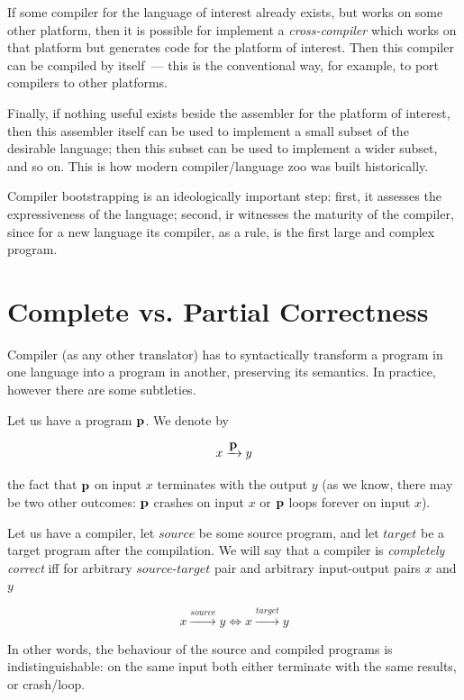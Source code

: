 If some compiler for the language of interest already exists, but works on some other platform, then it is possible for
implement a \emph{cross-compiler} which works on that platform but generates code for the platform of interest. Then
this compiler can be compiled by itself~--- this is the conventional way, for example, to port  compilers
to other platforms.

Finally, if nothing useful exists beside the assembler for the platform of interest, then this assembler itself can be
used to implement a small subset of the desirable language; then this subset can be used to implement a wider subset, and so on.
This is how modern compiler/language zoo was built historically.

Compiler bootstrapping is an ideologically important step: first, it assesses the expressiveness of the language; second, ir witnesses the
maturity of the compiler, since for a new language its compiler, as a rule, is the first large and complex program.

\section{Complete vs. Partial Correctness}

Compiler (as any other translator) has to syntactically transform a program in one language into a program in another, preserving its semantics.
In practice, however there are some subtleties.

Let us have a program $\mathbf{p}$. We denote by

\[
x\xrightarrow{\displaystyle{\mathbf{p}}} y
\]

the fact that $\mathbf{p}$ on input $x$ terminates with the output $y$ (as we know, there may be two other outcomes: $\mathbf{p}$ crashes on input $x$ or
$\mathbf{p}$ loops forever on input $x$).

Let us have a compiler, let $source$ be some source program, and let $target$ be a target program after the compilation.
We will say that a compiler is \emph{completely correct} iff for arbitrary $source$-$target$ pair and arbitrary
input-output pairs $x$ and $y$

\[
x\xrightarrow{\displaystyle{source}}y \Longleftrightarrow x\xrightarrow{\displaystyle{target}}y
\]

In other words, the behaviour of the source and compiled programs is indistinguishable: on the same input both either
terminate with the same results, or crash/loop.

